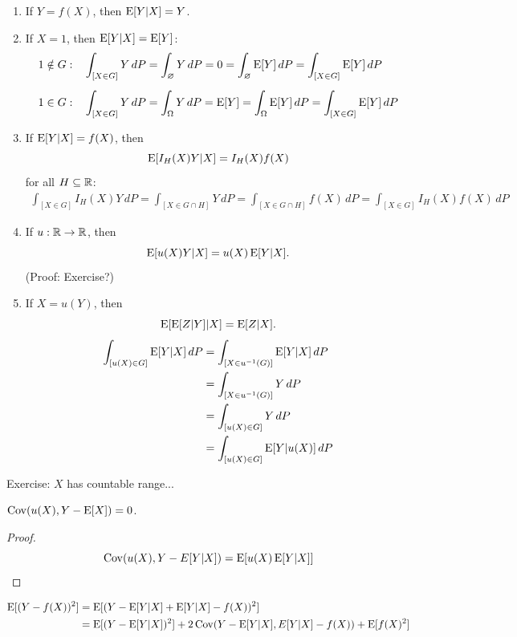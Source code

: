 \documentclass[12pt]{amsart}
\begin{document}
\begin{enumerate}
    \setlength{\itemsep}{1em}
    \item If $Y=f(X)$, then $\operatorname{E}[Y|X]=Y$.
    \item If $X=1$, then $\operatorname{E}[Y|X]=\operatorname{E}[Y]$:
\begin{align*}
    1\notin G:& & &\int_{[X\in G]} Y\,dP = \int_{\varnothing}Y\,dP = 0 = \int_{\varnothing}\operatorname{E}[Y]\,dP = \int_{[X\in G]} \operatorname{E}[Y]\,dP\\[0.5em]
    1\in G:& & &\int_{[X\in G]} Y\,dP = \int_\Omega Y\,dP = \operatorname{E}[Y] = \int_\Omega \operatorname{E}[Y]\,dP = \int_{[X\in G]} \operatorname{E}[Y]\,dP
\end{align*}
\item If $\operatorname{E}[Y|X]=f(X)$, then $$\operatorname{E}[I_H(X)Y|X]=I_H(X)f(X)$$ for all $H\subseteq\mathbb{R}$:
\begin{align*}
\int_{[X\in G]} I_H(X)Y\,dP =     \int_{[X\in G\cap H]} Y\,dP = \int_{[X\in G\cap H]} f(X)\,dP = \int_{[X\in G]} I_H(X)f(X)\,dP
\end{align*}
\item If $u:\mathbb{R}\to\mathbb{R}$, then $$\operatorname{E}[u(X)Y|X]=u(X)\operatorname{E}[Y|X].$$
(Proof: Exercise?)
\item If $X=u(Y)$, then $$\operatorname{E}[\operatorname{E}[Z|Y]|X]=\operatorname{E}[Z|X].$$
\begin{align*}
    \int_{[u(X)\in G]} \operatorname{E}[Y|X]\,dP &=
    \int_{[X\in u^{-1}(G)]} \operatorname{E}[Y|X]\,dP\\
    &= \int_{[X\in u^{-1}(G)]} Y\,dP\\
    &= \int_{[u(X)\in G]} Y\,dP\\
    &= \int_{[u(X)\in G]} \operatorname{E}[Y|u(X)]\,dP\\
\end{align*}
\end{enumerate}
Exercise: $X$ has countable range...

\begin{lemma}
    $\operatorname{Cov}(u(X), Y-\operatorname{E}[X])=0$.
\end{lemma}
\begin{proof}
    \[\operatorname{Cov}(u(X), Y-E[Y|X]) = \operatorname{E}[u(X)\operatorname{E}[Y|X]]\]
\end{proof}

\begin{align*}
    \operatorname{E}[(Y - f(X))^2] &= \operatorname{E}[(Y - \operatorname{E}[Y|X] + \operatorname{E}[Y|X] - f(X))^2]\\
    &= \operatorname{E}[(Y - \operatorname{E}[Y|X])^2] + 2\operatorname{Cov}(Y-\operatorname{E}[Y|X], E[Y|X] - f(X)) + \operatorname{E}[f(X)^2]
\end{align*}
\end{document}
